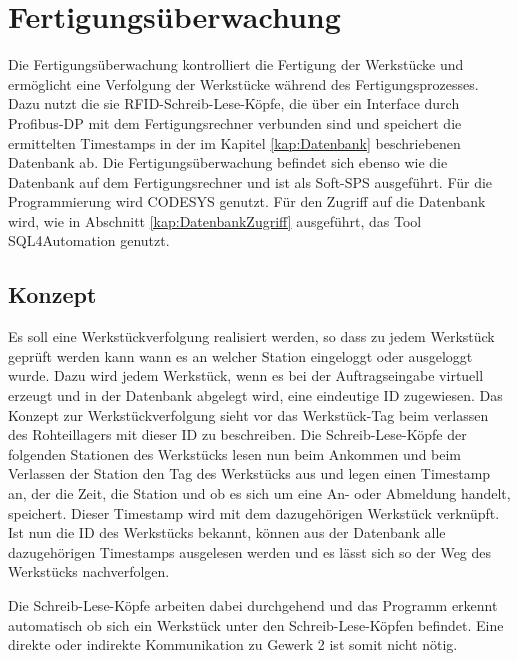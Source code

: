 
\chapter{Fertigungsüberwachung}
\label{kap:Fertigungsueberwachung}
Die Fertigungsüberwachung kontrolliert die Fertigung der Werkstücke und ermöglicht eine Verfolgung der Werkstücke während des Fertigungsprozesses. Dazu nutzt die sie RFID-Schreib-Lese-Köpfe, die über ein Interface durch Profibus-DP mit dem Fertigungsrechner verbunden sind und speichert die ermittelten Timestamps in der im Kapitel \ref{kap:Datenbank} beschriebenen Datenbank ab.
Die Fertigungsüberwachung befindet sich ebenso wie die Datenbank auf dem Fertigungsrechner und ist als Soft-SPS ausgeführt. Für die Programmierung wird CODESYS genutzt. Für den Zugriff auf die Datenbank wird, wie in Abschnitt \ref{kap:DatenbankZugriff} ausgeführt, das Tool SQL4Automation genutzt.

\section{Konzept}
Es soll eine Werkstückverfolgung realisiert werden, so dass zu jedem Werkstück geprüft werden kann wann es an welcher Station eingeloggt oder ausgeloggt wurde. Dazu wird jedem Werkstück, wenn es bei der Auftragseingabe virtuell erzeugt und in der Datenbank abgelegt wird, eine eindeutige ID zugewiesen. Das Konzept zur Werkstückverfolgung sieht vor das Werkstück-Tag beim verlassen des Rohteillagers mit dieser ID zu beschreiben. Die Schreib-Lese-Köpfe der folgenden Stationen des Werkstücks  lesen nun beim Ankommen und beim Verlassen der Station den Tag des Werkstücks aus und legen einen Timestamp an, der die Zeit, die Station und ob es sich um eine An- oder Abmeldung handelt, speichert. Dieser Timestamp wird mit dem dazugehörigen Werkstück verknüpft. Ist nun die ID des Werkstücks bekannt, können aus der Datenbank alle dazugehörigen Timestamps ausgelesen werden und es lässt sich so der Weg des Werkstücks nachverfolgen.

Die Schreib-Lese-Köpfe arbeiten dabei durchgehend und das Programm erkennt automatisch ob sich ein Werkstück unter den Schreib-Lese-Köpfen befindet. Eine direkte oder indirekte Kommunikation zu Gewerk 2 ist somit nicht nötig.

